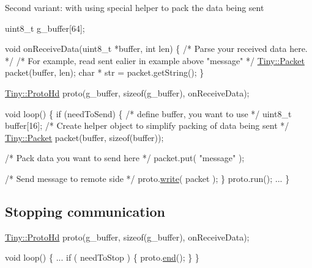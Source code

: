Second variant\+: with using special helper to pack the data being sent 
\begin{DoxyCode}
uint8\_t g\_buffer[64];

\textcolor{keywordtype}{void} onReceiveData(uint8\_t *buffer, \textcolor{keywordtype}{int} len)
\{
    \textcolor{comment}{/* Parse your received data here. */}
    \textcolor{comment}{/* For example, read sent ealier in example above "message" */}
    \hyperlink{classTiny_1_1Packet}{Tiny::Packet} packet(buffer, len);
    \textcolor{keywordtype}{char} * str = packet.getString();
\}

\hyperlink{classTiny_1_1ProtoHd}{Tiny::ProtoHd} proto(g\_buffer, \textcolor{keyword}{sizeof}(g\_buffer), onReceiveData);

\textcolor{keywordtype}{void} loop()
\{
    \textcolor{keywordflow}{if} (needToSend)
    \{
        \textcolor{comment}{/* define buffer, you want to use */}
        uint8\_t buffer[16];
        \textcolor{comment}{/* Create helper object to simplify packing of data being sent */}
        \hyperlink{classTiny_1_1Packet}{Tiny::Packet} packet(buffer, \textcolor{keyword}{sizeof}(buffer));

        \textcolor{comment}{/* Pack data you want to send here */}
        packet.put( \textcolor{stringliteral}{"message"} );

        \textcolor{comment}{/* Send message to remote side */}
        proto.\hyperlink{classTiny_1_1Proto_a46fbc8b8681431b9b0a9a4b953a8dc33}{write}( packet );
    \}
    proto.run();
    ...
\}
\end{DoxyCode}
\hypertarget{arduino_arduino_tiny_hd_close}{}\subsection{Stopping communication}\label{arduino_arduino_tiny_hd_close}

\begin{DoxyCode}
\hyperlink{classTiny_1_1ProtoHd}{Tiny::ProtoHd} proto(g\_buffer, \textcolor{keyword}{sizeof}(g\_buffer), onReceiveData);

\textcolor{keywordtype}{void} loop()
\{
    ...
    \textcolor{keywordflow}{if} ( needToStop )
    \{
        proto.\hyperlink{classTiny_1_1Proto_ae9f52fa1c4f18981672ad7af12633d4e}{end}();
    \}
\}
\end{DoxyCode}
 